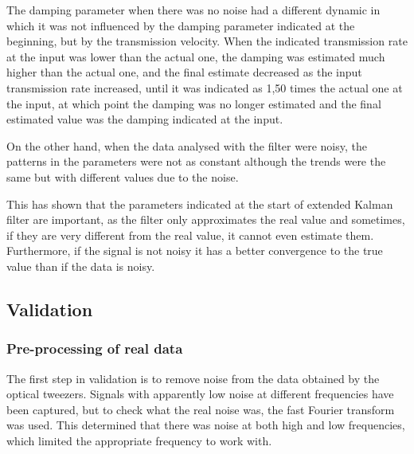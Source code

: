 \documentclass[12pt, a4paper]{article} %
\begin{document}
The damping parameter when there was no noise had a different dynamic in which it was not influenced by the damping parameter indicated at the beginning, but by the transmission velocity. When the indicated transmission rate at the input was lower than the actual one, the damping was estimated much higher than the actual one, and the final estimate decreased as the input transmission rate increased, until it was indicated as 1,50 times the actual one at the input, at which point the damping was no longer estimated and the final estimated value was the damping indicated at the input. 

On the other hand, when the data analysed with the filter were noisy, the patterns in the parameters were not as constant although the trends were the same but with different values due to the noise.

This has shown that the parameters indicated at the start of extended Kalman filter are important, as the filter only approximates the real value and sometimes, if they are very different from the real value, it cannot even estimate them. Furthermore, if the signal is not noisy it has a better convergence to the true value than if the data is noisy.

\setlength{\parskip}{0mm}

\subsection{Validation}

\subsubsection{Pre-processing of real data}

The first step in validation is to remove noise from the data obtained by the optical tweezers. Signals with apparently low noise at different frequencies have been captured, but to check what the real noise was, the fast Fourier transform was used. This determined that there was noise at both high and low frequencies, which limited the appropriate frequency to work with.

\setlength{\parskip}{4mm}
\end{document}
